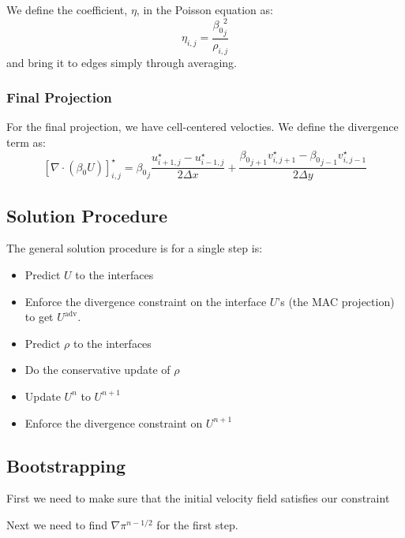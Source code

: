 We define the coefficient, $\eta$, in the Poisson equation as:
\begin{equation}
\eta_{i,j} = \frac{{\beta_0}_j^2}{\rho_{i,j}}
\end{equation}
and bring it to edges simply through averaging.

\subsubsection{Final Projection}
  
For the final projection, we have cell-centered velocties.  We 
define the divergence term as:
\begin{equation}
\left [ \nabla \cdot (\beta_0 U) \right ]_{i,j}^\star =
   {\beta_0}_j \frac{u^\star_{i+1,j} - 
                     u^\star_{i-1,j}}{2\Delta x} +
   \frac{{\beta_0}_{j+1} v^\star_{i,j+1} - 
         {\beta_0}_{j-1} v^\star_{i,j-1} }{2\Delta y}
\end{equation}

\subsection{Solution Procedure}

The general solution procedure is for a single step is:
\begin{itemize}

\item Predict $U$ to the interfaces 
\item Enforce the divergence constraint on the interface $U$'s (the
  MAC projection) to get $U^\mathrm{adv}$.
\item Predict $\rho$ to the interfaces
\item Do the conservative update of $\rho$
\item Update $U^n$ to $U^{n+1}$
\item Enforce the divergence constraint on $U^{n+1}$

\end{itemize}


\subsection{Bootstrapping}

First we need to make sure that the initial velocity field satisfies our constraint

Next we need to find $\nabla \pi^{n-1/2}$ for the first step.
